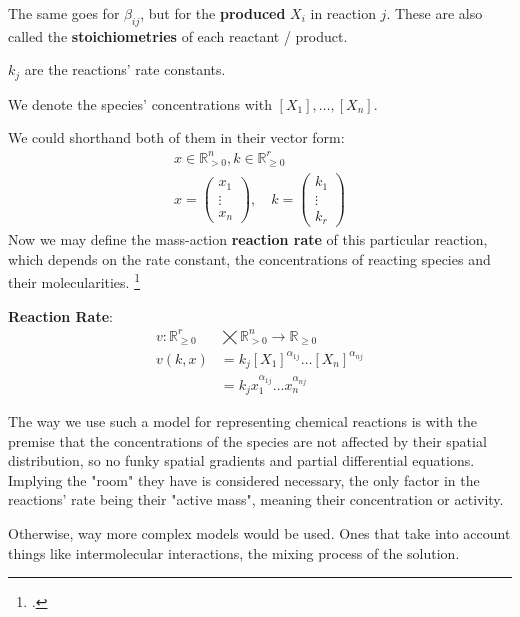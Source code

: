 The same goes for $\beta_{ij}$, but for the \textbf{produced} $X_i$ in reaction $j$. These are also called the \textbf{stoichiometries} of each reactant / product.

$k_j$ are the reactions' rate constants.

We denote the species' concentrations with $[X_1], \dots, [X_n]$.

We could shorthand both of them in their vector form:
\begin{gather*}
	x \in \mathbb{R}^n_{> 0},  k \in \mathbb{R}^r_{\geq 0} \\
	x =
	\begin{pmatrix}
		x_1 \\
		\vdots \\
		x_n 	
	\end{pmatrix}, \quad k =
	\begin{pmatrix*}
		k_1  \\
		\vdots \\
		k_r	
	\end{pmatrix*}
\end{gather*}
Now we may define the mass-action \textbf{reaction rate} of this particular reaction, which depends on the rate constant, the concentrations of reacting species and their molecularities.
\footcite{Derbez2015,Lorand2024}
\begin{definition}
	\textbf{Reaction Rate}:	
	\begin{align}\label{reaction_rate}
		v : \mathbb{R}^r_{\geq 0}  &\bigtimes \mathbb{R}^n_{> 0} \rightarrow \mathbb{R}_{\geq 0}  \nonumber \\
		v(k,x) &= k_j [X_1]^{\alpha_{1j}} \dots [X_n]^{\alpha_{nj}} \\
		&= k_j x_1^{\alpha_{1j}} \dots x_n^{\alpha_{nj}} \nonumber
	\end{align}
\end{definition}

The way we use such a model for representing chemical reactions is with the premise that the concentrations of the species are not affected by their spatial distribution, so no funky spatial gradients and partial differential equations. Implying the "room" they have is considered necessary, the only factor in the reactions' rate being their "active mass", meaning their concentration or activity.

Otherwise, way more complex models would be used. Ones that take into account things like intermolecular interactions, the mixing process of the solution.

